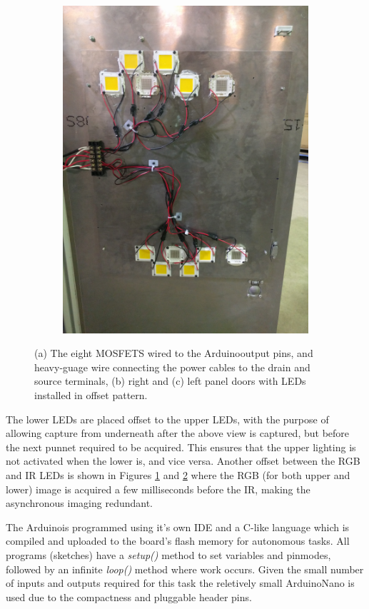 \documentclass[fleqn,twoside,12pt]{report}
\begin{document}
\begin{figure}[h]
\begin{subfigure}{0.25\textwidth}
		\label{fig:LED_door_1}
	\end{subfigure}%
	\begin{subfigure}{0.25\textwidth}
		\centering
		\includegraphics[width=0.8\linewidth]{LED_door_2.jpg}
		\caption{}
		\label{fig:LED_door_2}
	\end{subfigure}%
	\caption{(a) The eight MOSFETS wired to the Arduino\texttrademark output pins, and heavy-guage wire connecting the power cables to the drain and source terminals, (b) right and (c) left panel doors with LEDs installed in offset pattern.}
	\label{}
\end{figure}

The lower LEDs are placed offset to the upper LEDs, with the purpose of allowing capture from underneath after the above view is captured, but before the next punnet required to be acquired. This ensures that the upper lighting is not activated when the lower is, and vice versa. Another offset between the RGB and IR LEDs is shown in Figures \ref{fig:LED_door_1} and \ref{fig:LED_door_2} where the RGB (for both upper and lower) image is acquired a few milliseconds before the IR, making the asynchronous imaging redundant.

The Arduino\texttrademark is programmed using it's own IDE and a C-like language which is compiled and uploaded to the board's flash memory for autonomous tasks. All programs (sketches) have a \textit{setup()} method to set variables and pinmodes, followed by an infinite \textit{loop()} method where work occurs. Given the small number of inputs and outputs required for this task the reletively small Arduino\texttrademark Nano is used due to the compactness and pluggable header pins.
\end{document}
